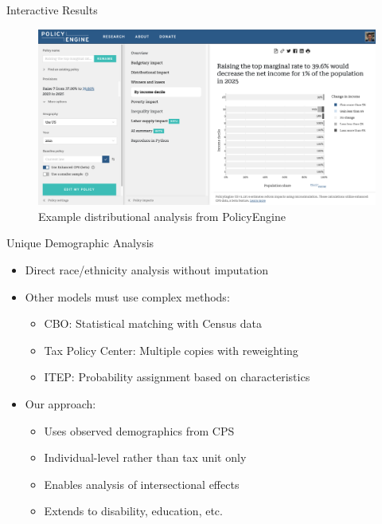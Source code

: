\documentclass{beamer}
\begin{document}
\begin{frame}{Interactive Results}
    \begin{figure}
        \centering
        \includegraphics[width=\textwidth]{../../paper/figures/policyengine_results.png}
        \caption{Example distributional analysis from PolicyEngine}
    \end{figure}
\end{frame}

\begin{frame}{Unique Demographic Analysis}
    \begin{itemize}
        \item Direct race/ethnicity analysis without imputation
        \item Other models must use complex methods:
        \begin{itemize}
            \item CBO: Statistical matching with Census data
            \item Tax Policy Center: Multiple copies with reweighting
            \item ITEP: Probability assignment based on characteristics
        \end{itemize}
        \item Our approach:
        \begin{itemize}
            \item Uses observed demographics from CPS
            \item Individual-level rather than tax unit only
            \item Enables analysis of intersectional effects
            \item Extends to disability, education, etc.
        \end{itemize}
    \end{itemize}
\end{frame}
\end{document}
